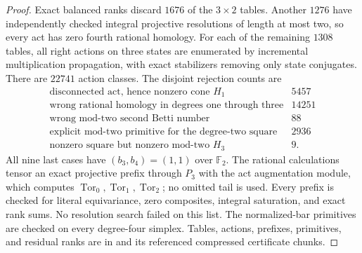 \begin{proof}
Exact balanced ranks discard $1676$ of the $3\times2$ tables.
Another $1276$ have independently checked integral projective
resolutions of length at most two, so every act has zero fourth
rational homology.  For each of the remaining $1308$ tables,
all right actions on three states are enumerated by incremental
multiplication propagation, with exact stabilizers removing only
state conjugates.  There are $22741$ action classes.  The
disjoint rejection counts are
\[
\begin{array}{l|r}
\text{disconnected act, hence nonzero cone }H_1&5457\\
\text{wrong rational homology in degrees one through three}&14251\\
\text{wrong mod-two second Betti number}&88\\
\text{explicit mod-two primitive for the degree-two square}&2936\\
\text{nonzero square but nonzero mod-two }H_3&9.
\end{array}
\]
All nine last cases have $(b_3,b_4)=(1,1)$ over $\mathbb F_2$.
The rational calculations tensor an exact projective prefix through
$P_3$ with the act augmentation module, which computes
$\operatorname{Tor}_0,\operatorname{Tor}_1,\operatorname{Tor}_2$;
no omitted tail is used.  Every prefix is checked for literal
equivariance, zero composites, integral saturation, and exact rank
sums.  No resolution search failed on this list.
The normalized-bar primitives are checked on every degree-four
simplex.  Tables, actions, prefixes, primitives, and residual ranks
are in  and its
referenced compressed certificate chunks.
\end{proof}

